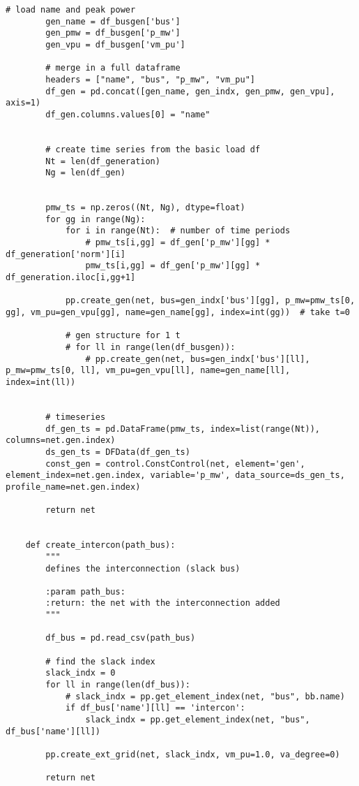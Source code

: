 \begin{lstlisting}[caption={Main code in Python with the Pandapower library}]
        # load name and peak power
        gen_name = df_busgen['bus']
        gen_pmw = df_busgen['p_mw']
        gen_vpu = df_busgen['vm_pu']

        # merge in a full dataframe
        headers = ["name", "bus", "p_mw", "vm_pu"]
        df_gen = pd.concat([gen_name, gen_indx, gen_pmw, gen_vpu], axis=1)
        df_gen.columns.values[0] = "name"


        # create time series from the basic load df
        Nt = len(df_generation)
        Ng = len(df_gen)


        pmw_ts = np.zeros((Nt, Ng), dtype=float)
        for gg in range(Ng):
            for i in range(Nt):  # number of time periods
                # pmw_ts[i,gg] = df_gen['p_mw'][gg] * df_generation['norm'][i]
                pmw_ts[i,gg] = df_gen['p_mw'][gg] * df_generation.iloc[i,gg+1]
            
            pp.create_gen(net, bus=gen_indx['bus'][gg], p_mw=pmw_ts[0, gg], vm_pu=gen_vpu[gg], name=gen_name[gg], index=int(gg))  # take t=0

            # gen structure for 1 t
            # for ll in range(len(df_busgen)):
                # pp.create_gen(net, bus=gen_indx['bus'][ll], p_mw=pmw_ts[0, ll], vm_pu=gen_vpu[ll], name=gen_name[ll], index=int(ll))


        # timeseries
        df_gen_ts = pd.DataFrame(pmw_ts, index=list(range(Nt)), columns=net.gen.index)
        ds_gen_ts = DFData(df_gen_ts)
        const_gen = control.ConstControl(net, element='gen', element_index=net.gen.index, variable='p_mw', data_source=ds_gen_ts, profile_name=net.gen.index)

        return net


    def create_intercon(path_bus):
        """
        defines the interconnection (slack bus)

        :param path_bus:
        :return: the net with the interconnection added
        """

        df_bus = pd.read_csv(path_bus)

        # find the slack index
        slack_indx = 0
        for ll in range(len(df_bus)):
            # slack_indx = pp.get_element_index(net, "bus", bb.name)
            if df_bus['name'][ll] == 'intercon':
                slack_indx = pp.get_element_index(net, "bus", df_bus['name'][ll])

        pp.create_ext_grid(net, slack_indx, vm_pu=1.0, va_degree=0)

        return net



\end{lstlisting}
